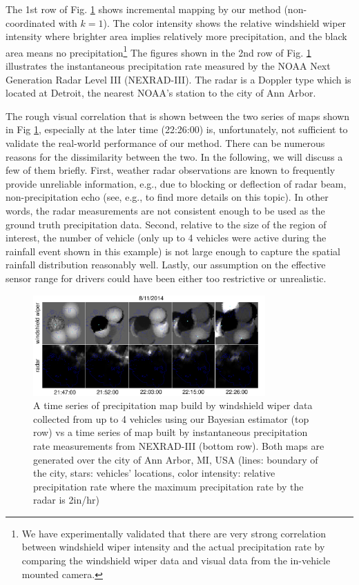 \documentclass[journal]{IEEEtran}
\begin{document}
The 1st row of Fig. \ref{fig:fig8} shows incremental mapping by our method (non-coordinated with $k=1$). The color intensity shows the relative windshield wiper intensity where brighter area implies relatively more precipitation, and the black area means no precipitation\footnote{We have experimentally validated that there are very strong correlation between windshield wiper intensity and the actual precipitation rate by comparing the windshield wiper data and visual data from the in-vehicle mounted camera.}
The figures shown in the 2nd row of Fig. \ref{fig:fig8} illustrates the instantaneous precipitation rate measured by the 
NOAA Next Generation Radar Level III (NEXRAD-III).
The radar is a Doppler type which is located at Detroit, the nearest NOAA's station to the city of Ann Arbor. 

The rough visual correlation that is shown between the two series of maps shown in Fig \ref{fig:fig8}, especially at the later time (22:26:00) is, unfortunately, not sufficient to validate the real-world performance of our method. 
There can be numerous reasons for the dissimilarity between the two. In the following, we will discuss a few of them briefly. First, weather radar observations are known to frequently provide unreliable information, e.g., due to blocking or deflection of radar beam, non-precipitation echo (see, e.g., \cite{berg2016creation} to find more details on this topic). In other words, the radar measurements are not consistent enough to be used as the ground truth precipitation data.
Second, relative to the size of the region of interest, the number of vehicle (only up to 4 vehicles were active during the rainfall event shown in this example) is not large enough to capture the spatial rainfall distribution reasonably well.
Lastly, our assumption on the effective sensor range for drivers could have been either too restrictive or unrealistic.


\begin{figure}
	\centering
	\includegraphics[width=3.5in]{figure/wind_wiper_data2}
	\caption{A time series of precipitation map build by windshield wiper data collected from up to 4 vehicles using our Bayesian estimator (top row) vs a time series of map built by instantaneous precipitation rate measurements from NEXRAD-III (bottom row). Both maps are generated over the city of Ann Arbor, MI, USA (lines: boundary of the city, stars: vehicles' locations, color intensity: relative precipitation rate where the maximum precipitation rate by the radar is 2in/hr)}
	\label{fig:fig8}
\end{figure}
\end{document}
